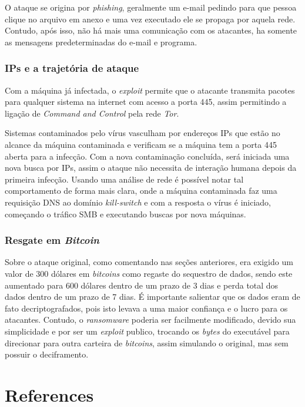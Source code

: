 \documentclass[12pt]{article}
\begin{document}
O ataque se origina por \textit{phishing}, geralmente um e-mail pedindo para que pessoa clique no arquivo em anexo e uma vez executado ele se propaga por aquela rede. Contudo, após isso, não há mais uma comunicação com os atacantes, ha somente as mensagens predeterminadas do e-mail e programa.

\subsubsection{IPs e a trajetória de ataque}

Com a máquina já infectada, o \textit{exploit} permite que o atacante transmita pacotes para qualquer sistema na internet com acesso a porta 445, assim permitindo a ligação de \textit{Command and Control} pela rede \textit{Tor}.

\noindent
Sistemas contaminados pelo vírus vasculham por endereços IPs que estão no alcance da máquina contaminada e verificam se a máquina tem a porta 445 aberta para a infecção. Com a nova contaminação concluída, será iniciada uma nova busca por IPs, assim o ataque não necessita de interação humana depois da primeira infecção. Usando uma análise de rede é possível notar tal comportamento de forma mais clara, onde a máquina contaminada faz uma requisição DNS ao domínio \textit{kill-switch} e com a resposta o vírus é iniciado, começando o tráfico SMB e executando buscas por nova máquinas.

\subsubsection{Resgate em \textit{Bitcoin}}

Sobre o ataque original, como comentando nas seções anteriores, era exigido um valor de 300 dólares em \textit{bitcoins} como regaste do sequestro de dados, sendo este aumentado para 600 dólares dentro de um prazo de 3 dias e perda total dos dados dentro de um prazo de 7 dias. É importante salientar que os dados eram de fato decriptografados, pois isto levava a uma maior confiança e o lucro para os atacantes. Contudo, o \textit{ransomware} poderia ser facilmente modificado, devido sua simplicidade e por ser um \textit{exploit} publico, trocando os \textit{bytes} do executável para direcionar para outra carteira de \textit{bitcoins}, assim simulando o original, mas sem possuir o deciframento.


\section{References}
\end{document}

